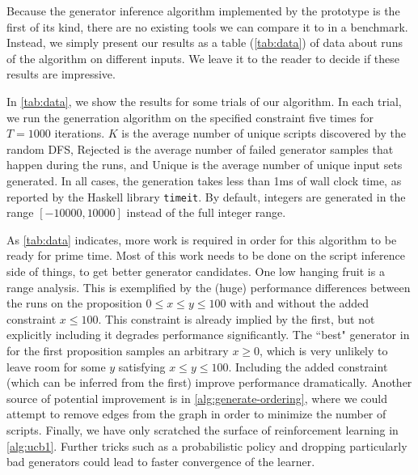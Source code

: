 \documentclass[sigconf,nonacm,review,anonymous]{acmart}
\begin{document}
Because the generator inference algorithm implemented by the prototype is the first of its kind, there are no existing tools we can compare it to in a benchmark. Instead, we simply present our results as a table (\autoref{tab:data}) of data about runs of the algorithm on different inputs. We leave it to the reader to decide if these results are impressive.

In \autoref{tab:data}, we show the results for some trials of our algorithm. In each trial, we run the generration algorithm on the specified constraint five times for $T = 1000$ iterations. $K$ is the average number of unique scripts discovered by the random DFS, Rejected is the average number of failed generator samples that happen during the runs, and Unique is the average number of unique input sets generated. In all cases, the generation takes less than 1ms of wall clock time, as reported by the Haskell library \texttt{timeit}. By default, integers are generated in the range $[-10000,10000]$ instead of the full integer range.

As \autoref{tab:data} indicates, more work is required in order for this algorithm to be ready for prime time. Most of this work needs to be done on the script inference side of things, to get better generator candidates. One low hanging fruit is a range analysis. This is exemplified by the (huge) performance differences between the runs on the proposition $0 \leq x \leq y \leq 100$ with and without the added constraint $x \leq 100$. This constraint is already implied by the first, but not explicitly including it degrades performance significantly. The ``best" generator in for the first proposition samples an arbitrary $x \geq 0$, which is very unlikely to leave room for some $y$ satisfying $x \leq y \leq 100$. Including the added constraint (which can be inferred from the first) improve performance dramatically. Another source of potential improvement is in \autoref{alg:generate-ordering}, where we could attempt to remove edges from the graph in order to minimize the number of scripts. Finally, we have only scratched the surface of reinforcement learning in \autoref{alg:ucb1}. Further tricks such as a probabilistic policy and dropping particularly bad generators could lead to faster convergence of the learner.
\end{document}
